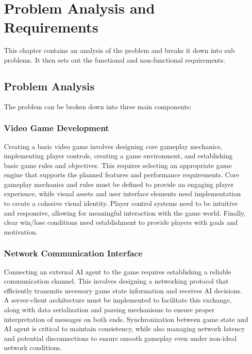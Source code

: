 \chapter{Problem Analysis and Requirements}

This chapter contains an analysis of the problem and breaks it down into sub problems. It then sets out the functional and non-functional requirements.

\section{Problem Analysis}
The problem can be broken down into three main components:

\subsection{Video Game Development}
Creating a basic video game involves designing core gameplay mechanics, implementing player controls, creating a game environment, and establishing basic game rules and objectives. 
This requires selecting an appropriate game engine that supports the planned features and performance requirements. 
Core gameplay mechanics and rules must be defined to provide an engaging player experience, while visual assets and user interface elements need implementation to create a cohesive visual identity. 
Player control systems need to be intuitive and responsive, allowing for meaningful interaction with the game world. Finally, clear win/lose conditions need establishment to provide players with goals and motivation.

\subsection{Network Communication Interface}
Connecting an external AI agent to the game requires establishing a reliable communication channel. 
This involves designing a networking protocol that efficiently transmits necessary game state information and receives AI decisions. 
A server-client architecture must be implemented to facilitate this exchange, along with data serialization and parsing mechanisms to ensure proper interpretation of messages on both ends. 
Synchronization between game state and AI agent is critical to maintain consistency, while also managing network latency and potential disconnections to ensure smooth gameplay even under non-ideal network conditions.

